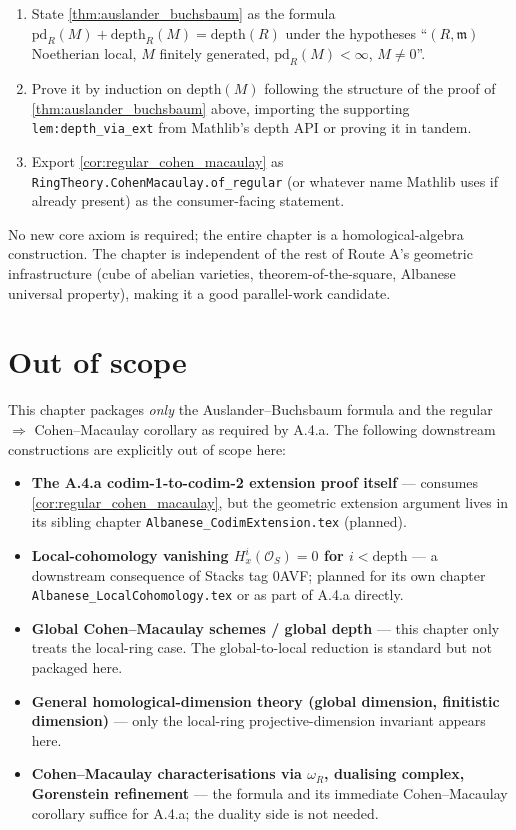 \begin{enumerate}
  \item State \cref{thm:auslander_buchsbaum} as the formula
    \(\text{pd}_R(M) + \text{depth}_R(M) = \text{depth}(R)\) under the hypotheses
    ``\((R, \mathfrak{m})\) Noetherian local, \(M\) finitely generated, \(\text{pd}_R(M) < \infty\),
    \(M \neq 0\)''.
  \item Prove it by induction on \(\text{depth}(M)\) following the structure of the
    proof of \cref{thm:auslander_buchsbaum} above, importing the supporting
    \texttt{lem:depth_via_ext} from Mathlib's depth API or
    proving it in tandem.
  \item Export \cref{cor:regular_cohen_macaulay} as
    \texttt{RingTheory.CohenMacaulay.of\_regular} (or whatever name Mathlib uses if
    already present) as the consumer-facing statement.
\end{enumerate}
No new core axiom is required; the entire chapter is a homological-algebra construction.
The chapter is independent of the rest of Route A's geometric infrastructure (cube of
abelian varieties, theorem-of-the-square, Albanese universal property), making it a good
parallel-work candidate.

\section{Out of scope}
\label{sec:ab_out_of_scope}

This chapter packages \emph{only} the Auslander--Buchsbaum formula and the regular
\(\Rightarrow\) Cohen--Macaulay corollary as required by A.4.a. The following downstream
constructions are explicitly out of scope here:
\begin{itemize}
  \item \textbf{The A.4.a codim-1-to-codim-2 extension proof itself} --- consumes
    \cref{cor:regular_cohen_macaulay}, but the geometric extension argument
    lives in its sibling chapter \texttt{Albanese\_CodimExtension.tex} (planned).
  \item \textbf{Local-cohomology vanishing \(H^i_x(\mathcal{O}_S) = 0\) for \(i < \text{depth}\)}
    --- a downstream consequence of Stacks tag 0AVF; planned for its own chapter
    \texttt{Albanese\_LocalCohomology.tex} or as part of A.4.a directly.
  \item \textbf{Global Cohen--Macaulay schemes / global depth} --- this chapter only treats
    the local-ring case. The global-to-local reduction is standard but not packaged here.
  \item \textbf{General homological-dimension theory (global dimension, finitistic
    dimension)} --- only the local-ring projective-dimension invariant appears here.
  \item \textbf{Cohen--Macaulay characterisations via \(\omega_R\), dualising complex,
    Gorenstein refinement} --- the formula and its immediate Cohen--Macaulay corollary
    suffice for A.4.a; the duality side is not needed.
\end{itemize}
